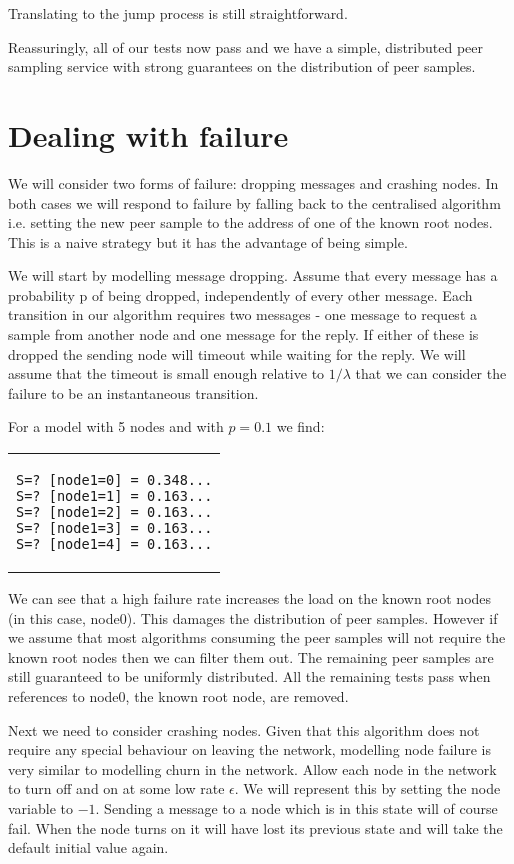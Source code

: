 \documentclass[a4paper,10pt]{article}
\newcommand{\code}[1]{
  \footnotesize
  
}
\newcommand{\prismmodel}[1]{
  \begin{quotation}
  \code{../models/#1.sm}
  \end{quotation}
}
\newenvironment{prismprop}[0]{
  \begin{center}
  \begin{tabular}{c}
  \footnotesize
}{
  \end{tabular}
  \end{center}
}
\begin{document}
Translating to the jump process is still straightforward.

\prismmodel{dtmc_full}

Reassuringly, all of our tests now pass and we have a simple, distributed peer sampling service with strong guarantees on the distribution of peer samples.

\section{Dealing with failure}

We will consider two forms of failure: dropping messages and crashing nodes. In both cases we will respond to failure by falling back to the centralised algorithm i.e. setting the new peer sample to the address of one of the known root nodes. This is a naive strategy but it has the advantage of being simple. 

We will start by modelling message dropping. Assume that every message has a probability p of being dropped, independently of every other message. Each transition in our algorithm requires two messages - one message to request a sample from another node and one message for the reply. If either of these is dropped the sending node will timeout while waiting for the reply. We will assume that the timeout is small enough relative to $1/\lambda$ that we can consider the failure to be an instantaneous transition.

\prismmodel{ctmc_full_error}

For a model with 5 nodes and with $p=0.1$ we find:

\begin{prismprop}
\begin{lstlisting}
S=? [node1=0] = 0.348...
S=? [node1=1] = 0.163...
S=? [node1=2] = 0.163...
S=? [node1=3] = 0.163...
S=? [node1=4] = 0.163...
\end{lstlisting}
\end{prismprop}

We can see that a high failure rate increases the load on the known root nodes (in this case, node0). This damages the distribution of peer samples. However if we assume that most algorithms consuming the peer samples will not require the known root nodes then we can filter them out. The remaining peer samples are still guaranteed to be uniformly distributed. All the remaining tests pass when references to node0, the known root node, are removed.

Next we need to consider crashing nodes. Given that this algorithm does not require any special behaviour on leaving the network, modelling node failure is very similar to modelling churn in the network. Allow each node in the network to turn off and on at some low rate $\epsilon$. We will represent this by setting the node variable to $-1$. Sending a message to a node which is in this state will of course fail. When the node turns on it will have lost its previous state and will take the default initial value again.
\end{document}
